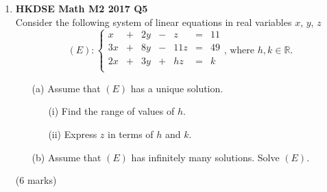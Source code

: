 \documentclass{report}
\begin{document}
\begin{enumerate}
	\item \textbf{HKDSE Math M2 2017 Q5}\\
	Consider the following system of linear equations in real variables $x$, $y$, $z$
		$$(E) : \left\{\begin{matrix}
		x&  +&2y&  -&z& = &11  \\
		3x& +&8y&  -&11z& = & 49 \\
		2x& +&3y&  +&hz& = & k \\
		\end{matrix}\right.\text{, where } h,k \in \mathbb{R}.$$ 
	\begin{enumerate}
		\item [(a)] Assume that $(E)$ has a unique solution.
		\begin{enumerate}
			\item [(i)]Find the range of values of $h$.
			\item [(ii)]Express $z$ in terms of $h$ and $k$.
		\end{enumerate}
		\item [(b)]Assume that $(E)$ has infinitely many solutions. Solve $(E)$.
	\end{enumerate}
	(6 marks)

	\newpage
	

\end{enumerate}
\end{document}
